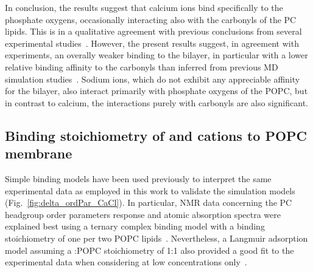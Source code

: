 \documentclass[journal=jpcbfk,manuscript=article]{achemso}
\begin{document}
In conclusion, the results suggest that calcium ions bind specifically to the phosphate oxygens, occasionally interacting also with the carbonyls of the PC lipids. This is in a qualitative agreement with previous conclusions from several experimental studies~\cite{hauser76, hauser78, herbette84, cevc90, binder02}. However, the present results suggest, in
agreement with experiments, an overally weaker binding to the bilayer, in particular with a lower relative binding affinity to the carbonyls than inferred from previous MD simulation studies~\cite{bockmann03, bockmann04, melcrova16, javanainen17}. Sodium ions, which do not exhibit any appreciable affinity for the bilayer, also interact primarily with phosphate oxygens of the POPC, but in contrast to calcium, the interactions purely with carbonyls are also significant.


\subsection{Binding stoichiometry of  and  cations to POPC membrane}


Simple binding models have been used previously to interpret the same experimental data \cite{altenbach84,macdonald87} as employed in this work to validate the simulation models (Fig.~\ref{fig:delta_ordPar_CaCl}). In particular, NMR data concerning the PC headgroup order parameters response and atomic absorption spectra were explained best using a ternary complex binding model with a binding stoichiometry of one  per two POPC lipids~\cite{altenbach84}. Nevertheless, a Langmuir adsorption model assuming a :POPC stoichiometry of 1:1 also provided a good fit to the experimental data when considering  at low concentrations only~\cite{macdonald87}.
\end{document}
